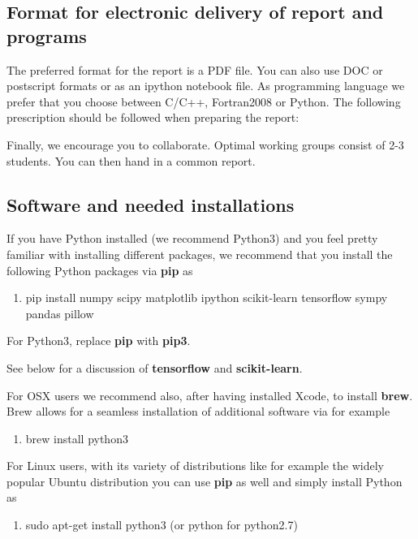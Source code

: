\documentclass[%
oneside,                 %
final,                   %
10pt]{article}
\begin{document}
\noindent
\subsection*{Format for electronic delivery of report and programs}

The preferred format for the report is a PDF file. You can also use DOC or postscript formats or as an ipython notebook file.  As programming language we prefer that you choose between C/C++, Fortran2008 or Python. The following prescription should be followed when preparing the report:


Finally, 
we encourage you to collaborate. Optimal working groups consist of 
2-3 students. You can then hand in a common report. 



\subsection*{Software and needed installations}

If you have Python installed (we recommend Python3) and you feel pretty familiar with installing different packages, 
we recommend that you install the following Python packages via \textbf{pip} as
\begin{enumerate}
\item pip install numpy scipy matplotlib ipython scikit-learn tensorflow sympy pandas pillow
\end{enumerate}

\noindent
For Python3, replace \textbf{pip} with \textbf{pip3}.

See below for a discussion of \textbf{tensorflow} and \textbf{scikit-learn}. 

For OSX users we recommend also, after having installed Xcode, to install \textbf{brew}. Brew allows 
for a seamless installation of additional software via for example
\begin{enumerate}
\item brew install python3
\end{enumerate}

\noindent
For Linux users, with its variety of distributions like for example the widely popular Ubuntu distribution
you can use \textbf{pip} as well and simply install Python as 
\begin{enumerate}
\item sudo apt-get install python3  (or python for python2.7)
\end{enumerate}
\end{document}
